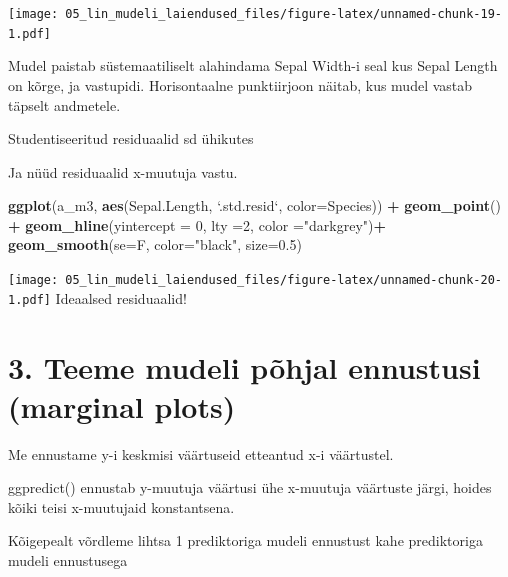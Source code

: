 \documentclass[]{book}
\newenvironment{Shaded}{\begin{snugshade}}{\end{snugshade}}
\newcommand{\DataTypeTok}[1]{\textcolor[rgb]{0.13,0.29,0.53}{#1}}
\newcommand{\DecValTok}[1]{\textcolor[rgb]{0.00,0.00,0.81}{#1}}
\newcommand{\FloatTok}[1]{\textcolor[rgb]{0.00,0.00,0.81}{#1}}
\newcommand{\KeywordTok}[1]{\textcolor[rgb]{0.13,0.29,0.53}{\textbf{#1}}}
\newcommand{\NormalTok}[1]{#1}
\newcommand{\OperatorTok}[1]{\textcolor[rgb]{0.81,0.36,0.00}{\textbf{#1}}}
\newcommand{\StringTok}[1]{\textcolor[rgb]{0.31,0.60,0.02}{#1}}
\begin{document}
\texttt{[image: 05\_lin\_mudeli\_laiendused\_files/figure-latex/unnamed-chunk-19-1.pdf]}

Mudel paistab süstemaatiliselt alahindama Sepal Width-i seal kus Sepal Length on kõrge, ja vastupidi. Horisontaalne punktiirjoon näitab, kus mudel vastab täpselt andmetele.

Studentiseeritud residuaalid sd ühikutes

Ja nüüd residuaalid x-muutuja vastu.

\begin{Shaded}
\begin{Highlighting}[]
\KeywordTok{ggplot}\NormalTok{(a_m3, }\KeywordTok{aes}\NormalTok{(Sepal.Length, }\StringTok{`}\DataTypeTok{.std.resid}\StringTok{`}\NormalTok{, }\DataTypeTok{color=}\NormalTok{Species)) }\OperatorTok{+}\StringTok{ }
\StringTok{  }\KeywordTok{geom_point}\NormalTok{() }\OperatorTok{+}
\StringTok{  }\KeywordTok{geom_hline}\NormalTok{(}\DataTypeTok{yintercept =} \DecValTok{0}\NormalTok{, }\DataTypeTok{lty =}\DecValTok{2}\NormalTok{, }\DataTypeTok{color =}\StringTok{"darkgrey"}\NormalTok{)}\OperatorTok{+}
\StringTok{  }\KeywordTok{geom_smooth}\NormalTok{(}\DataTypeTok{se=}\NormalTok{F, }\DataTypeTok{color=}\StringTok{"black"}\NormalTok{, }\DataTypeTok{size=}\FloatTok{0.5}\NormalTok{)}
\end{Highlighting}
\end{Shaded}

\texttt{[image: 05\_lin\_mudeli\_laiendused\_files/figure-latex/unnamed-chunk-20-1.pdf]}
Ideaalsed residuaalid!

\hypertarget{teeme-mudeli-pohjal-ennustusi-marginal-plots}{%
\section*{3. Teeme mudeli põhjal ennustusi (marginal plots)}\label{teeme-mudeli-pohjal-ennustusi-marginal-plots}}

Me ennustame y-i keskmisi väärtuseid etteantud x-i väärtustel.

ggpredict() ennustab y-muutuja väärtusi ühe x-muutuja väärtuste järgi, hoides kõiki teisi x-muutujaid konstantsena.

Kõigepealt võrdleme lihtsa 1 prediktoriga mudeli ennustust kahe prediktoriga mudeli ennustusega
\end{document}
